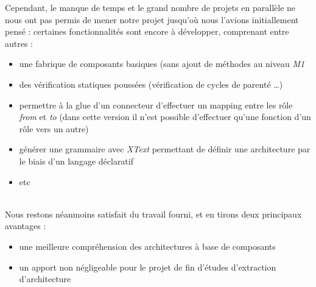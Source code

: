     Cependant, le manque de temps et le grand nombre de projets en parallèle ne nous ont pas permis de mener notre projet jusqu'où nous l'avions initiallement pensé : certaines fonctionnalités sont encore à développer, comprenant entre autres :
    \begin{itemize}
    	\item une fabrique de composants basiques (sans ajout de méthodes au niveau \emph{M1}
        \item des vérification statiques poussées (vérification de cycles de parenté \ldots)
        \item permettre à la glue d'un connecteur d'effectuer un mapping entre les rôle \emph{from} et \emph{to} (dans cette version il n'est possible d'effectuer qu'une fonction d'un rôle vers un autre)
        \item générer une grammaire avec \emph{XText} permettant de définir une architecture par le biais d'un langage déclaratif
        \item etc
    \end{itemize}
    ~\\
    
    Nous restons néanmoins satisfait du travail fourni, et en tirons deux principaux avantages :
    \begin{itemize}
    	\item une meilleure compréhension des architectures à base de composants
        \item un apport non négligeable pour le projet de fin d'études d'extraction d'architecture
    \end{itemize}
	